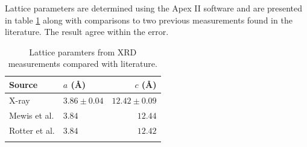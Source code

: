 Lattice parameters are determined using the Apex II software and are presented in table \ref{Table:3:LatticeParams} along with comparisons to two previous measurements found in the literature. The result agree within the error.
\medskip
\begin{table}[htbp]
    \begin{center}
        \caption{Lattice paramters from XRD measurements compared with literature.}
        \begin{tabular}{llr}
\toprule
Source  &  $a$ (\AA) & $c$ (\AA) \\
\midrule
X-ray   & $3.86\pm0.04$  & $12.42\pm0.09$ \\
Mewis et al.\cite{Mewis1980} & $3.84$ & $12.44$ \\
Rotter et al.\cite{Rotter2010} & $3.84$ & $12.42$ \\
\bottomrule
        \label{Table:3:LatticeParams}
        \end{tabular}
    \end{center}
\end{table}

